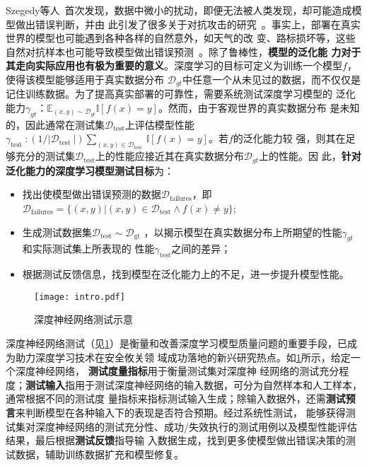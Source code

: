 Szegedy等人~\cite{szegedy2013intriguing}首次发现，数据中微小的扰动，即便无法被人类发现，却可能造成模型做出错误判断，并由
此引发了很多关于对抗攻击的研究~\cite{yuan2021meta}。事实上，部署在真实世界的模型也可能遇到各种各样的自然意外，如天气的改
变、路标损坏等，这些自然对抗样本也可能导致模型做出错误预测~\cite{hendrycks2021natural}。除了鲁棒性，\textbf{模型的泛化能
    力对于其走向实际应用也有极为重要的意义}。深度学习的目标可定义为训练一个模型${f}$，使得该模型能够适用于真实数据分布
$\mathcal D_{gt}$中任意一个从未见过的数据，而不仅仅是记住训练数据。为了提高真实部署的可靠性，需要系统测试深度学习模型的
泛化能力$\gamma_{gt}$：$\mathbb{E}_{(x, y) \sim \mathcal{D}_{g t}} \mathbb{I}[f(x)=y]$。然而，由于客观世界的真实数据分布
是未知的，因此通常在测试集$\mathcal D_{\text{test}}$上评估模型性能$\gamma_{\text {test }}:\left(1 /\left|\mathcal
    D_{\text {test }}\right|\right) \sum_{(x, y) \in \mathcal D_{\text {test }}} \mathbb{I}[f(x)=y]$。若${f}$的泛化能力较
强，则其在足够充分的测试集$\mathcal D_{\text{test}}$上的性能应接近其在真实数据分布$\mathcal D_{gt}$上的性能。因
此，\textbf{针对泛化能力的深度学习模型测试目标}为：
\begin{itemize}
    \item[（1）] 找出使模型做出错误预测的数据$\mathcal D_{\text{failures}}$，即
          $\mathcal D_{\text{failures}}=\{(x, y) | (x, y) \in \mathcal D_{\text{test}}
              \wedge f(x) \neq y\}$;
    \item[（2）] 生成测试数据集$\mathcal{D}_{\text{test}} \sim \mathcal{D}_{\text{gt}}$
          ，以揭示模型在真实数据分布上所期望的性能$\gamma_{gt}$和实际测试集上所表现的
          性能$\gamma_{\text{test}}$之间的差异；
    \item[（3）] 根据测试反馈信息，找到模型在泛化能力上的不足，进一步提升模型性能。
\end{itemize}

\begin{figure}[htp]
    \centering
    \texttt{[image: intro.pdf]}
    \caption{深度神经网络测试示意}
    \label{fig:ch1:intro}
\end{figure}

深度神经网络测试（见\cref{fig:ch1:intro}）是衡量和改善深度学习模型质量问题的重要手段，已成为助力深度学习技术在安全攸关领
域成功落地的新兴研究热点。如\cref{fig:ch1:intro}所示，给定一个深度神经网络， \textbf{测试度量指标}用于衡量测试集对深度神
经网络的测试充分程度；\textbf{测试输入}指用于测试深度神经网络的输入数据，可分为自然样本和人工样本，通常根据不同的测试度
量指标来指标测试输入生成；除输入数据外，还需\textbf{测试预言}来判断模型在各种输入下的表现是否符合预期。经过系统性测试，
能够获得测试集对深度神经网络的测试充分性、成功/失效执行的测试用例以及模型性能评估结果，最后根据\textbf{测试反馈}指导输
入数据生成，找到更多使模型做出错误决策的测试数据，辅助训练数据扩充和模型修复。

